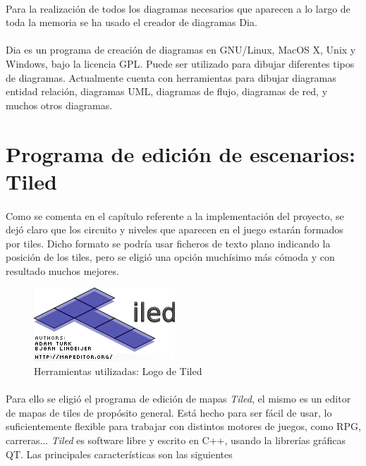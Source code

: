 \paragraph{}
Para la realización de todos los diagramas necesarios que aparecen a lo largo de toda la memoria se ha usado el creador de 
diagramas Dia.

\paragraph{}
Dia es un programa de creación de diagramas en GNU/Linux, MacOS X, Unix y Windows, bajo la 
licencia GPL. Puede ser utilizado para dibujar diferentes tipos de diagramas. Actualmente cuenta con herramientas para dibujar 
diagramas entidad relación, diagramas UML, diagramas de flujo, diagramas de red, y muchos otros diagramas.

\section{Programa de edición de escenarios: Tiled}

\paragraph{}
Como se comenta en el capítulo referente a la implementación del proyecto, se
dejó claro que los circuito y niveles que aparecen
en el juego estarán formados por tiles. Dicho formato se podría usar ficheros de texto plano indicando la posición de 
los tiles, pero se eligió una opción muchísimo más cómoda y con resultado muchos mejores.

\begin{figure}[H]
  \label{tiled_logo}
  \begin{center}
    \includegraphics[scale=1]{imagenes/tiled_logo.png}
  \end{center}
  \caption{Herramientas utilizadas: Logo de Tiled}
\end{figure}

\paragraph{}
Para ello se eligió el programa de edición de mapas \emph{Tiled}, el mismo es
un editor de mapas de tiles de propósito general.
Está hecho para ser fácil de usar, lo suficientemente flexible para trabajar con distintos motores de juegos, como RPG, carreras... 
\emph{Tiled} es software libre y escrito en C++, usando la librerías gráficas QT. Las principales características son las siguientes

